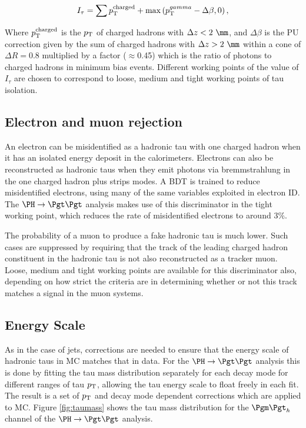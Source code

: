 \begin{equation}
I_{\tau} = \sum p_{\mathrm{T}}^{\text{charged}} + \max \left( p_{\mathrm{T}}^{gamma} - \Delta \beta,
0 \right) , 
\label{eq:tauIsolation}
\end{equation}

Where $p_{\mathrm{T}}^{\text{charged}}$ is the $p_{\mathrm{T}}$ of charged hadrons with $\Delta z < 2~\mm$, and
$\Delta \beta$ is the \ac{PU} correction given by the sum of charged hadrons with $\Delta
z > 2~\mm$ within a cone of $\Delta R = 0.8$ multiplied by a factor ($\approx$0.45) which is the
ratio of photons to charged hadrons in minimum bias events. Different working
points of the value of $I_{\tau}$ are chosen to correspond to loose, medium and
tight working points of tau isolation.

\subsection{Electron and muon rejection}

An electron can be misidentified as a hadronic tau with one charged hadron when
it has an isolated energy deposit in the calorimeters. Electrons can also be
reconstructed as hadronic taus when they emit photons via bremmstrahlung in the
one charged hadron plus strips modes. A \ac{BDT} is trained to reduce
misidentified electrons, using many of the same variables exploited in electron
ID. The $\PH\to\Pgt\Pgt$ analysis makes use of this discriminator in the tight
working point, which reduces the rate of misidentified electrons to around
$3\%$. 

The probability of a muon to produce a fake hadronic tau is much lower. Such
cases are suppressed by requiring that the track of the leading charged hadron
constituent in the hadronic tau is not also reconstructed as a tracker muon.
Loose, medium and tight working points are available for this discriminator
also, depending on how strict the criteria are in determining whether or not
this track matches a signal in the muon systems. 

\subsection{Energy Scale}

As in the case of jets, corrections are needed to ensure that the energy scale
of hadronic taus in \ac{MC} matches that in data. For the $\PH \to \Pgt\Pgt$
analysis this is done by fitting the tau mass distribution separately for each
decay mode for different ranges of tau $p_{\mathrm{T}}$, allowing the tau energy scale to
float freely in each fit. The result is a set of $p_{\mathrm{T}}$ and decay mode dependent
corrections which are applied to MC. Figure \ref{fig:taumass} shows the tau
mass distribution for the $\mutau$ channel of the $\PH\to\Pgt\Pgt$ analysis. 

